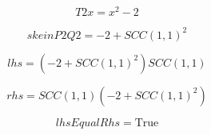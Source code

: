\documentclass[letterpaper, 10pt]{extarticle}
\begin{document}
\begin{dmath*}
T2x =
    x^{2} - 2
\end{dmath*}


\begin{dmath*}
skeinP2Q2 =
    -2 + SCC(1, 1)^{2}
\end{dmath*}


\begin{dmath*}
lhs =
    \left(-2 + SCC(1, 1)^{2}\right) SCC(1, 1)
\end{dmath*}


\begin{dmath*}
rhs =
    SCC(1, 1) \left(-2 + SCC(1, 1)^{2}\right)
\end{dmath*}


\begin{dmath*}
lhsEqualRhs =
    \mathrm{True}
\end{dmath*}
\end{document}
